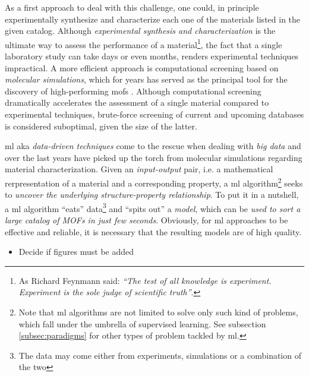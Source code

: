 As a first approach to deal with this challenge, one could, in principle
experimentally synthesize and characterize each one of the materials listed in
the given catalog. Although \emph{experimental synthesis and
characterization} is the
ultimate way to assess the performance of a material\footnote{As Richard
Feynmann said: \emph{``The test of all knowledge is experiment. Experiment is
the sole judge of scientific truth''}.}, the fact that a single laboratory study
can take days or even months, renders experimental techniques impractical.  A
more efficient approach is computational screening based on \emph{molecular simulations},
which for years has served as the principal tool for the discovery of
high-performing \glspl{mof} \parencite{chong55, chong56, chong57, chong58,
chong59}. Although computational screening dramatically accelerates the
assessment of a single material compared to experimental techniques, brute-force
screening of current and upcoming databases is considered suboptimal, given the
size of the latter.

\Gls{ml} aka \emph{data-driven
techniques} come to the rescue when dealing with \emph{big data}
and over the last years have picked up the torch from molecular simulations
regarding material characterization. Given an
\emph{input-output} pair, i.e. a mathematical
rerpresentation of a material and a corresponding property, a \gls{ml}
algorithm\footnote{Note that \gls{ml}
algorithms are not limited to solve only such kind of problems, which fall under
the umbrella of supervised learning. See subsection
\ref{subsec:paradigms} for other types of problem tackled by \gls{ml}.} seeks to
\emph{uncover the underlying structure-property relationship}. To put it in a
nutshell, a \gls{ml} algorithm ``eats'' data\footnote{The data may come either
from experiments, simulations or a combination of the two} and ``spits out'' a
\emph{model}, which can be \emph{used to sort a large catalog of
MOFs in just few seconds}. Obviously, for \gls{ml} approaches to be effective
and reliable, it is necessary that the resulting models are of high quality.

\begin{itemize}
	\item Decide if figures must be added
\end{itemize}

